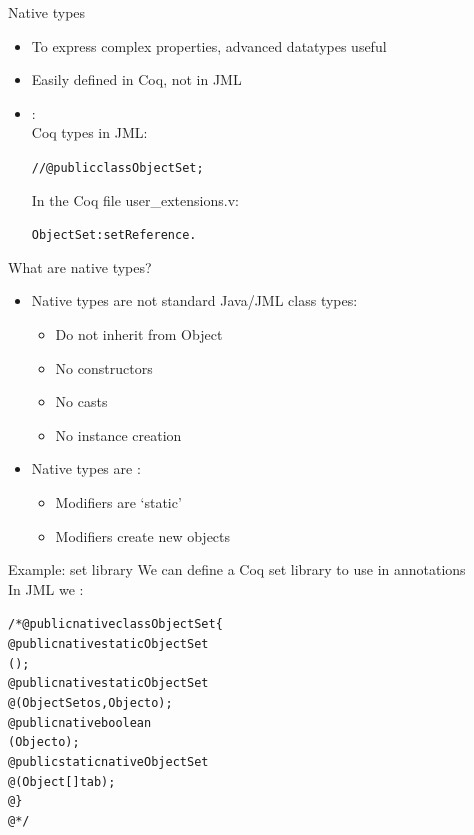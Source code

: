 \documentclass[final,nocolorBG,a4,mobius,nototal,pdf,slideColor]{prosper}
\begin{document}
\begin{slide}{Native types}
\begin{itemize}
\item To express complex properties, advanced datatypes useful
\item Easily defined in Coq, not in JML
\item {}: \\
Coq types in JML: 
\begin{alltt}
//@  public  class ObjectSet; 
\end{alltt}
In the Coq file user\_extensions.v:
\begin{alltt}
   ObjectSet : set Reference.
\end{alltt}
\end{itemize}
\end{slide}

\begin{slide}{What are native types?}
\begin{itemize}
\item Native types are not standard Java/JML class types:
\begin{itemize}
\item Do not inherit from Object
\item No constructors
\item No casts
\item No instance creation
\end{itemize}
\item Native types are : 
\begin{itemize}
\item Modifiers are `static'
\item Modifiers create new objects 
\end{itemize}
\end{itemize}
\end{slide}

\begin{slide}{Example: set library}
We can define a Coq set library to use in annotations\\

In JML we :
\begin{alltt}
/*@ public native class ObjectSet \{
  @ public native static ObjectSet 
              ();
  @ public native static ObjectSet 
  @           (ObjectSet os, Object o);
  @ public native boolean 
              (Object o);
  @ public static native ObjectSet 
  @           (Object [] tab);
  @ \}
  @*/
\end{alltt}
\end{slide}
\end{document}
